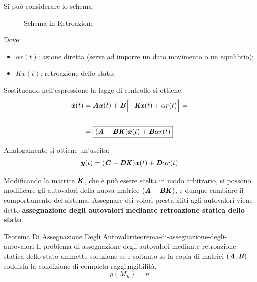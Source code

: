 \documentclass[12pt]{article}
\begin{document}
Si pu\`o considerare lo schema:
\begin{figure}[H]
    \centering
    \caption{Schema in Retroazione}
    \label{fig:schema-in-retroazione}
\end{figure}

Dove:
\begin{itemize}
    \item $\alpha r(t)$: azione diretta (serve ad imporre un dato movimento o un equilibrio);
    \item $Kx(t)$: retroazione dello stato;
\end{itemize}

Sostituendo nell'espressione la lagge di controllo si ottiene:
\begin{align*}
    \dot{\textbf{\textit{x}}} (t) & = \textbf{\textit{Ax}}(t) + \textbf{\textit{B}}\Bigl[ -\textbf{\textit{Kx}}(t) + \alpha r(t) \Bigr] = \\
    \\
                     & = \boxed{(\textbf{\textit{A}}-\textbf{\textit{BK}})\textbf{\textit{x}}(t) + \textbf{\textit{B}}\alpha r(t)}
\end{align*}

Analogamente si ottiene un'uscita:
\[ \textbf{\textit{y}}(t) = (\textbf{\textit{C}}-\textbf{\textit{DK}})\textbf{\textit{x}}(t) + \textbf{\textit{D}}\alpha r(t) \]

Modificando la matrice $\textbf{\textit{K}}$, che \`e pu\`o essere scelta in modo arbitrario, si possono modificare gli autovalori della nuova matrice $(\textbf{\textit{A}}-\textbf{\textit{BK}})$, e dunque cambiare il comportamento del sistema. Assegnare dei volori prestabiliti agli autovalori viene detto \textbf{assegnazione degli autovalori mediante retroazione statica dello stato}.

\begin{theorem}{Teorema Di Assegnazione Degli Autovalori}{teorema-di-assegnazione-degli-autovalori}
    Il problema di assegnazione degli autovalori mediante retroazione statica dello stato ammette soluzione se e soltanto se la copia di matrici $(\textbf{\textit{A}},\textbf{\textit{B}})$ soddisfa la condizione di completa raggiungibilit\`a.
    \[ \rho(M_R) = n \]
\end{theorem}
\end{document}

